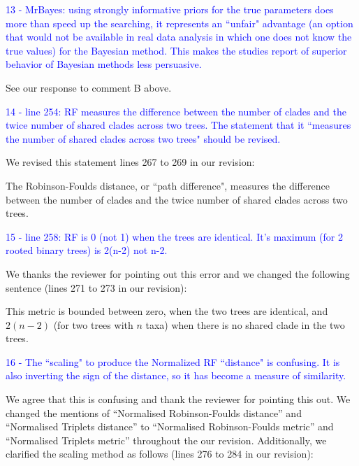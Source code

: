 \documentclass[11pt]{letter}
\begin{document}
\begin{letter}{}

\textcolor{blue}{13 - MrBayes: using strongly informative priors for the true parameters does more than speed up the searching, it represents an ``unfair" advantage (an option that would not be available in real data analysis in which one does not know the true values) for the Bayesian method. This makes the studies report of superior behavior of Bayesian methods less persuasive.}

See our response to comment B above.


\textcolor{blue}{14 - line 254: RF measures the difference between the number of clades and the twice number of shared clades across two trees. The statement that it ``measures the number of shared clades across two trees" should be revised.}

We revised this statement lines 267 to 269 in our revision:

\hfill\begin{minipage}{\dimexpr\textwidth-1cm}
The Robinson-Foulds distance, or ``path difference", measures the difference between the number of clades and the twice number of shared clades across two trees.
\end{minipage}


\textcolor{blue}{15 - line 258: RF is 0 (not 1) when the trees are identical. It's maximum (for 2 rooted binary trees) is 2(n-2) not n-2.}

We thanks the reviewer for pointing out this error and we changed the following sentence (lines 271 to 273 in our revision):

\hfill\begin{minipage}{\dimexpr\textwidth-1cm}
This metric is bounded between zero, when the two trees are identical, and $2(n-2)$ (for two trees with $n$ taxa) when there is no shared clade in the two trees.
\end{minipage}


\textcolor{blue}{16 - The ``scaling" to produce the Normalized RF ``distance" is confusing. It is also inverting the sign of the distance, so it has become a measure of similarity.}

We agree that this is confusing and thank the reviewer for pointing this out. We changed the mentions of ``Normalised Robinson-Foulds distance'' and ``Normalised Triplets distance'' to ``Normalised Robinson-Foulds metric'' and ``Normalised Triplets metric'' throughout the our revision. Additionally, we clarified the scaling method as follows (lines 276 to 284 in our revision):


\end{letter}
\end{document}

